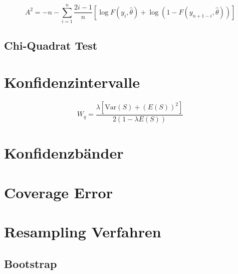 \begin{equation}
A^2 = -n - \sum_{i=1}^n \frac{2 i - 1}{n} \left[ \log F(y_i, \hat{\theta}) + \log( 1 - F(y_{n+1-i}, \hat{\theta})) \right]
\end{equation}

\subsection{Chi-Quadrat Test}

\section{Konfidenzintervalle}

\begin{equation}
W_q = \frac{
	\lambda \left[ \mathrm{Var}(S) + (E(S))^2 \right]
}{
	2 (1 - \lambda E(S)) 
}
\end{equation}

\section{Konfidenzbänder}

\section{Coverage Error}

\section{Resampling Verfahren}

\subsection{Bootstrap}























